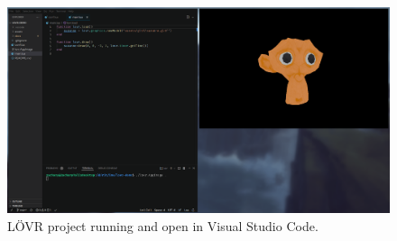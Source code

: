 \documentclass[12pt, letterpaper]{article}
\begin{document}
\begin{figure}[H]
    \includegraphics[scale=0.4]{assets/img/lovr-project.png}
    \caption{L{\"O}VR project running and open in Visual Studio Code.}
\end{figure}
\end{document}
